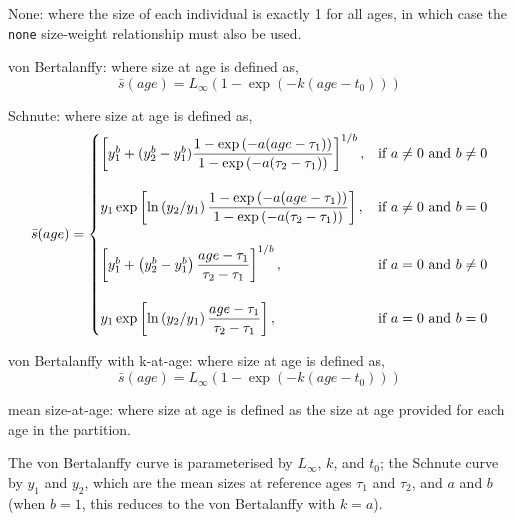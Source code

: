 \begin{description}
\item {None:} where the size of each individual is exactly 1 for all ages, in which case the \texttt{none} size-weight relationship must also be used.
\item{von Bertalanffy:} where size at age is defined as,
\begin{equation} 
\bar{s}(age)= L_\infty \left( 1 - \exp \left( -k \left(age-t_0 \right) \right) \right)
\end{equation}

\item{Schnute:} where size at age is defined as,
\begin{equation}
\bar{s}(age)=\displaystyle\begin{cases}
  \left[ y_1^b + (y_2^b - y_1^b) \dfrac{1-\exp \left(-a(age - \tau_1) \right)}{1-\exp \left(-a(\tau_2 - \tau_1) \right)} \right]^{1/b}, & \text{if $a\ne0$ and $b\ne0$} \\
  \AddVspace
  y_1 \exp \left[ \ln \left( y_2 / y_1 \right) \dfrac{1-\exp \left(-a(age - \tau_1) \right)}{1-\exp \left(-a(\tau_2 - \tau_1) \right)} \right], & \text{if $a\ne0$ and $b=0$} \\
  \AddVspace
  \left[ y_1^b + \left( y_2^b - y_1^b \right) \dfrac{age-\tau_1}{\tau_2 - \tau_1} \right]^{1/b}, & \text{if $a=0$ and $b\ne0$} \\
  \AddVspace
  y_1 \exp \left[ \ln \left( y_2/y_1 \right) \dfrac{age-\tau_1}{\tau_2 - \tau_1} \right] , & \text{if $a=0$ and $b=0$} \\
  \end{cases}
\end{equation}

\item{von Bertalanffy with k-at-age:} where size at age is defined as,
\begin{equation} 
\bar{s}(age)= L_\infty \left( 1 - \exp \left( -k \left(age-t_0 \right) \right) \right)
\end{equation}

\item{mean size-at-age:} where size at age is defined as the size at age provided for each age in the partition.
\end{description}

The von Bertalanffy curve is parameterised by $L_\infty$, $k$, and $t_0$; the Schnute curve \citep{836} by $y_1$ and $y_2$, which are the mean sizes at reference ages $\tau_1$ and $\tau_2$, and $a$ and $b$ (when $b=1$, this reduces to the von Bertalanffy with $k=a$). 

